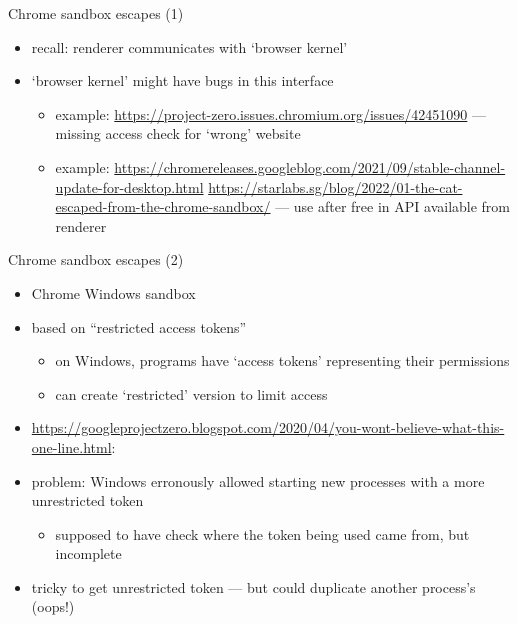 \begin{frame}{Chrome sandbox escapes (1)}
    \begin{itemize}
    \item recall: renderer communicates with `browser kernel'
    \item `browser kernel' might have bugs in this interface
        \begin{itemize}
        \item example: {\scriptsize \url{https://project-zero.issues.chromium.org/issues/42451090}} --- missing access check for `wrong' website
        \item example: {\scriptsize \url{https://chromereleases.googleblog.com/2021/09/stable-channel-update-for-desktop.html} \url{https://starlabs.sg/blog/2022/01-the-cat-escaped-from-the-chrome-sandbox/}} --- use after free in API available from renderer
        \end{itemize}
    \end{itemize}
\end{frame}

\begin{frame}{Chrome sandbox escapes (2)}
    \begin{itemize}
    \item Chrome Windows sandbox
    \item based on ``restricted access tokens''
        \begin{itemize}
        \item on Windows, programs have `access tokens' representing their permissions
        \item can create `restricted' version to limit access
        \end{itemize}
    \item {\tiny \url{https://googleprojectzero.blogspot.com/2020/04/you-wont-believe-what-this-one-line.html}}:
    \item problem: Windows erronously allowed starting new processes with a more unrestricted token
        \begin{itemize}
        \item supposed to have check where the token being used came from, but incomplete
        \end{itemize}
    \item tricky to get unrestricted token --- but could duplicate another process's (oops!)
    \end{itemize}
\end{frame}

